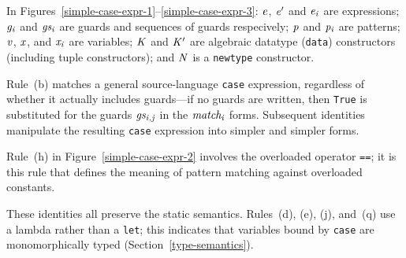 In Figures~\ref{simple-case-expr-1}--\ref{simple-case-expr-3}:
\mbox{$\it e$}, \mbox{$\it e'$} and \mbox{$\it e_i$} are expressions; 
\mbox{$\it g_i$} and \mbox{$\it gs_i$} are guards and sequences of guards respecively;
\mbox{$\it p$} and \mbox{$\it p_i$} are patterns; 
\mbox{$\it v$}, \mbox{$\it x$}, and \mbox{$\it x_i$} are variables; 
\mbox{$\it K$} and \mbox{$\it K'$} are algebraic datatype (\mbox{\tt data}) constructors (including
tuple constructors);  and \mbox{$\it N$} is a \mbox{\tt newtype} constructor.

Rule~(b) matches a general source-language
\mbox{\tt case} expression, regardless of whether it actually includes
guards---if no guards are written, then \mbox{\tt True} is substituted for the guards \mbox{$\it gs_{i,j}$}
in the \mbox{$\it match_i$} forms.
Subsequent identities manipulate the resulting \mbox{\tt case} expression into simpler
and simpler forms.

Rule~(h) in Figure~\ref{simple-case-expr-2} involves the
overloaded operator \mbox{\tt ==}; it is this rule that defines the
meaning of pattern matching against overloaded constants.


These identities all preserve the static semantics.  Rules~(d), (e), (j), and~(q)
use a lambda rather than a \mbox{\tt let}; this indicates that variables bound
by \mbox{\tt case} are monomorphically typed (Section~\ref{type-semantics}).


